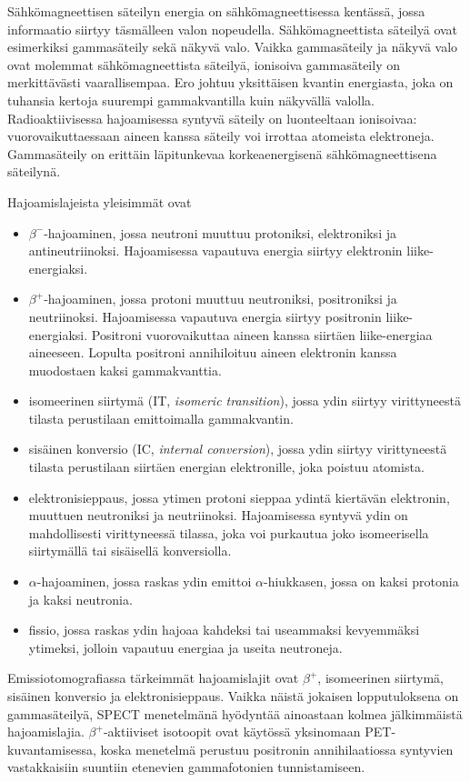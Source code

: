 Sähkömagneettisen säteilyn energia on sähkömagneettisessa kentässä, jossa informaatio siirtyy täsmälleen valon nopeudella.\cite{cherry_basic_2012} Sähkömagneettista säteilyä ovat esimerkiksi gammasäteily sekä näkyvä valo. Vaikka gammasäteily ja näkyvä valo ovat molemmat sähkömagneettista säteilyä, ionisoiva gammasäteily on merkittävästi vaarallisempaa. Ero johtuu yksittäisen kvantin energiasta, joka on tuhansia kertoja suurempi gammakvantilla kuin näkyvällä valolla. Radioaktiivisessa hajoamisessa syntyvä säteily on luonteeltaan ionisoivaa: vuorovaikuttaessaan aineen kanssa säteily voi irrottaa atomeista elektroneja\cite{cherry_interaction_2012}. Gammasäteily on erittäin läpitunkevaa korkeaenergisenä sähkömagneettisena säteilynä.

Hajoamislajeista yleisimmät ovat\cite{cherry_modes_2012}
\begin{itemize}
    \item $\beta^{-}$-hajoaminen, jossa neutroni muuttuu protoniksi, elektroniksi ja antineutriinoksi.  Hajoamisessa vapautuva energia siirtyy elektronin liike-energiaksi.
    \item $\beta^{+}$-hajoaminen, jossa protoni muuttuu neutroniksi, positroniksi ja neutriinoksi. Hajoamisessa vapautuva energia siirtyy positronin liike-energiaksi. Positroni vuorovaikuttaa aineen kanssa siirtäen liike-energiaa aineeseen. Lopulta positroni annihiloituu aineen elektronin kanssa muodostaen kaksi gammakvanttia.
    \item isomeerinen siirtymä (IT, \textit{isomeric transition}), jossa ydin siirtyy virittyneestä tilasta perustilaan emittoimalla gammakvantin.
    \item sisäinen konversio (IC, \textit{internal conversion}), jossa ydin siirtyy virittyneestä tilasta perustilaan siirtäen energian elektronille, joka poistuu atomista.
    \item elektronisieppaus, jossa ytimen protoni sieppaa ydintä kiertävän elektronin, muuttuen neutroniksi ja neutriinoksi. Hajoamisessa syntyvä ydin on mahdollisesti virittyneessä tilassa, joka voi purkautua joko isomeerisella siirtymällä tai sisäisellä konversiolla.
    \item $\alpha$-hajoaminen, jossa raskas ydin emittoi $\alpha$-hiukkasen, jossa on kaksi protonia ja kaksi neutronia.
    \item fissio, jossa raskas ydin hajoaa kahdeksi tai useammaksi kevyemmäksi ytimeksi, jolloin vapautuu energiaa ja useita neutroneja.
\end{itemize}
Emissiotomografiassa tärkeimmät hajoamislajit ovat $\beta^{+}$, isomeerinen siirtymä, sisäinen konversio ja elektronisieppaus\cite{cherry_modes_2012}. Vaikka näistä jokaisen lopputuloksena on gammasäteilyä, SPECT menetelmänä hyödyntää ainoastaan kolmea jälkimmäistä hajoamislajia. $\beta^{+}$-aktiiviset isotoopit ovat käytössä yksinomaan PET-kuvantamisessa, koska menetelmä perustuu positronin annihilaatiossa syntyvien vastakkaisiin suuntiin etenevien gammafotonien tunnistamiseen. 

